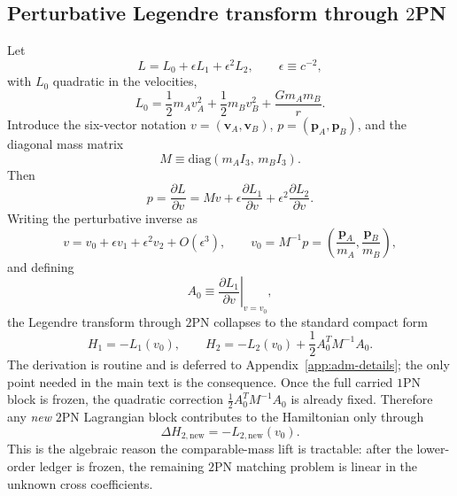 \documentclass[11pt]{article}
\newcommand{\vct}{\mathbf v}
\newcommand{\OnePN}{\mathrm{1PN}}
\newcommand{\TwoPN}{\mathrm{2PN}}
\begin{document}
\subsection{Perturbative Legendre transform through \texorpdfstring{$2$}{2}PN}
\label{sec:adm-legendre}

Let
\begin{equation}
L=L_0+\epsilon L_1+\epsilon^2 L_2,
\qquad
\epsilon\equiv c^{-2},
\label{eq:adm-epsilon-expansion}
\end{equation}
with \(L_0\) quadratic in the velocities,
\begin{equation}
L_0=\frac12 m_A v_A^2+\frac12 m_B v_B^2+\frac{Gm_A m_B}{r}.
\label{eq:adm-L0-repeat}
\end{equation}
Introduce the six-vector notation
\(v=(\vct_A,\vct_B)\),
\(p=(\mathbf p_A,\mathbf p_B)\),
and the diagonal mass matrix
\begin{equation}
M\equiv \mathrm{diag}(m_A I_3,\,m_B I_3).
\label{eq:adm-mass-matrix}
\end{equation}
Then
\begin{equation}
p=\frac{\partial L}{\partial v}
=Mv+\epsilon\frac{\partial L_1}{\partial v}
+\epsilon^2\frac{\partial L_2}{\partial v}.
\label{eq:adm-momentum-expansion}
\end{equation}
Writing the perturbative inverse as
\begin{equation}
v=v_0+\epsilon v_1+\epsilon^2 v_2+O(\epsilon^3),
\qquad
v_0=M^{-1}p=
\left(\frac{\mathbf p_A}{m_A},\frac{\mathbf p_B}{m_B}\right),
\label{eq:adm-v-expansion}
\end{equation}
and defining
\begin{equation}
A_0\equiv
\left.\frac{\partial L_1}{\partial v}\right|_{v=v_0},
\label{eq:adm-A0}
\end{equation}
the Legendre transform through \(\TwoPN\) collapses to the standard compact form
\begin{equation}
H_1=-L_1(v_0),
\qquad
H_2=-L_2(v_0)+\frac12 A_0^T M^{-1}A_0.
\label{eq:adm-H1H2-formula}
\end{equation}
The derivation is routine and is deferred to
Appendix~\ref{app:adm-details}; the only point needed in the main text is the
consequence.  Once the full carried \(\OnePN\) block is frozen, the quadratic
correction \(\frac12 A_0^T M^{-1}A_0\) is already fixed.  Therefore any
\emph{new} \(\TwoPN\) Lagrangian block contributes to the Hamiltonian only through
\begin{equation}
\Delta H_{2,\mathrm{new}}=-L_{2,\mathrm{new}}(v_0).
\label{eq:adm-new-block-linear}
\end{equation}
This is the algebraic reason the comparable-mass lift is tractable: after the lower-order
ledger is frozen, the remaining \(\TwoPN\) matching problem is linear in the unknown
cross coefficients.
\end{document}
